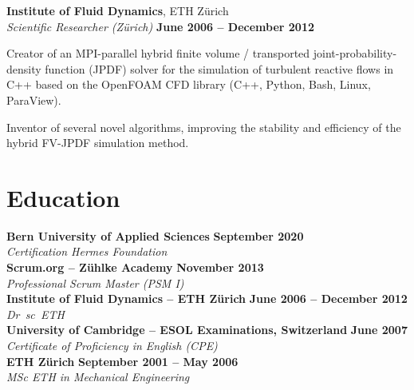 \documentclass[line,11pt,a4paper]{resume}
\begin{document}
\begin{resume}
\textbf{Institute of Fluid Dynamics}, ETH Z\"urich\\\vspace{1mm}%
\textsl{Scientific Researcher (Zürich)}
  \hfill \textbf{June 2006 -- December 2012}\\
\vspace{-4mm}%
\begin{list2}
  \item Creator of an MPI-parallel hybrid finite volume / transported
    joint-probability-density function (JPDF) solver for the simulation of
    turbulent reactive flows in C++ based on the OpenFOAM CFD library (C++,
    Python, Bash, Linux, ParaView).

  \item Inventor of several novel algorithms, improving the stability and
    efficiency of the hybrid FV-JPDF simulation method.
\end{list2}

\section{\mysidestyle Education}\vspace{2mm}

\textbf{Bern University of Applied Sciences} \hfill \textbf{September 2020}\\
\vspace{1mm}%
\textsl{Certification Hermes Foundation}\\
\vspace{-1mm}%
%
\textbf{Scrum.org -- Z\"uhlke Academy}
  \hfill \textbf{November 2013}\\
\vspace{1mm}%
\textsl{Professional Scrum Master (PSM I)}\\
\vspace{-1mm}%
%
\textbf{Institute of Fluid Dynamics -- ETH Z\"urich}
  \hfill \textbf{June 2006 -- December 2012}\\
\vspace{1mm}%
\textsl{Dr\ sc\ ETH}\\
\vspace{-1mm}%
%
\textbf{University of Cambridge -- ESOL Examinations, Switzerland}
  \hfill \textbf{June 2007}\\
\vspace{1mm}%
\textsl{Certificate of Proficiency in English (CPE)}\\
\vspace{-1mm}%
%
\textbf{ETH Z\"urich}
  \hfill \textbf{September 2001 -- May 2006}\\
\vspace{1mm}%
\textsl{MSc ETH in Mechanical Engineering}%
\vspace{-3mm}\\\vspace{-1mm}%


\end{resume}
\end{document}
